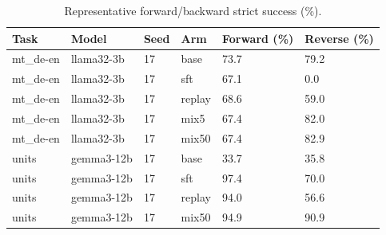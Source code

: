 \begin{table}[t]
\centering\small
\begin{tabular}{llllll}
\toprule
Task & Model & Seed & Arm & Forward (\%) & Reverse (\%) \\
\midrule
mt\_de-en & llama32-3b & 17 & base & 73.7 & 79.2 \\
mt\_de-en & llama32-3b & 17 & sft & 67.1 & 0.0 \\
mt\_de-en & llama32-3b & 17 & replay & 68.6 & 59.0 \\
mt\_de-en & llama32-3b & 17 & mix5 & 67.4 & 82.0 \\
mt\_de-en & llama32-3b & 17 & mix50 & 67.4 & 82.9 \\
units & gemma3-12b & 17 & base & 33.7 & 35.8 \\
units & gemma3-12b & 17 & sft & 97.4 & 70.0 \\
units & gemma3-12b & 17 & replay & 94.0 & 56.6 \\
units & gemma3-12b & 17 & mix50 & 94.9 & 90.9 \\
\bottomrule
\end{tabular}
\caption{Representative forward/backward strict success (\%).}
\label{tab:preservation-summary}
\end{table}
